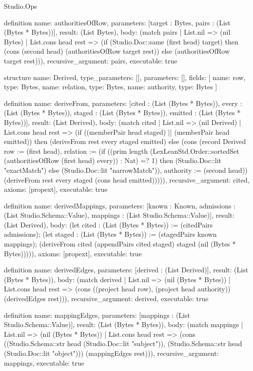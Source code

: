 \begin{lexlean}{Studio.Ops}
\begin{semanticmodule}
{definition{
  name: authoritiesOfRow,
  parameters: [target : Bytes, pairs : (List (Bytes * Bytes))],
  result: (List Bytes),
  body: (match pairs
    | List.nil => (nil Bytes)
    | List.cons head rest => (if (Studio.Doc::same (first head) target) then (cons (second head) (authoritiesOfRow target rest)) else (authoritiesOfRow target rest))),
  recursive_argument: pairs,
  executable: true
}

structure{
  name: Derived,
  type_parameters: [],
  parameters: [],
  fields: [
    {name: row, type: Bytes},
    {name: relation, type: Bytes},
    {name: authority, type: Bytes}
  ]
}

definition{
  name: deriveFrom,
  parameters: [cited : (List (Bytes * Bytes)), every : (List (Bytes * Bytes)), staged : (List (Bytes * Bytes)), emitted : (List (Bytes * Bytes))],
  result: (List Derived),
  body: (match cited
    | List.nil => (nil Derived)
    | List.cons head rest => (if ((memberPair head staged) || (memberPair head emitted)) then (deriveFrom rest every staged emitted) else (cons (record Derived {row := (first head), relation := (if ((prim length (LexLeanStd.Order::sortedSet (authoritiesOfRow (first head) every)) : Nat) =? 1) then (Studio.Doc::lit "exactMatch") else (Studio.Doc::lit "narrowMatch")), authority := (second head)}) (deriveFrom rest every staged (cons head emitted))))),
  recursive_argument: cited,
  axioms: [propext],
  executable: true
}

definition{
  name: derivedMappings,
  parameters: [known : Known, admissions : (List Studio.Schema::Value), mappings : (List Studio.Schema::Value)],
  result: (List Derived),
  body: (let cited : (List (Bytes * Bytes)) := (citedPairs admissions); (let staged : (List (Bytes * Bytes)) := (stagedPairs known mappings); (deriveFrom cited (appendPairs cited staged) staged (nil (Bytes * Bytes))))),
  axioms: [propext],
  executable: true
}

definition{
  name: derivedEdges,
  parameters: [derived : (List Derived)],
  result: (List (Bytes * Bytes)),
  body: (match derived
    | List.nil => (nil (Bytes * Bytes))
    | List.cons head rest => (cons ((project head row), (project head authority)) (derivedEdges rest))),
  recursive_argument: derived,
  executable: true
}

definition{
  name: mappingEdges,
  parameters: [mappings : (List Studio.Schema::Value)],
  result: (List (Bytes * Bytes)),
  body: (match mappings
    | List.nil => (nil (Bytes * Bytes))
    | List.cons head rest => (cons ((Studio.Schema::str head (Studio.Doc::lit "subject")), (Studio.Schema::str head (Studio.Doc::lit "object"))) (mappingEdges rest))),
  recursive_argument: mappings,
  executable: true
}

}
\end{semanticmodule}
\end{lexlean}
